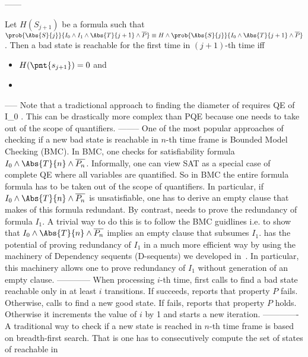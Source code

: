 ------
\begin{proposition}
\label{prop:bad_state}
Let $H(S_{j+1})$ be a formula such that $\prob{\Abs{S}{j}}{I_0 \wedge
  I_1 \wedge \Abs{T}{j+1} \wedge \overline{P}} \equiv H \wedge
\prob{\Abs{S}{j}}{I_0 \wedge \Abs{T}{j+1} \wedge \overline{P}}$.
Then a bad state  is reachable for the first time in $(j+1)$-th
time iff 
\begin{itemize}
\item $H(\pnt{s_{j+1}})=0$ and 
\item {} 
\end{itemize}
\end{proposition}
-----
 Note that
a tradictional approach to finding the diameter of \Ks requires
 QE of  {I_0 \wedge {}}. This
can be drastically more complex than PQE because one needs to take
 out of the scope of quantifiers.
--------
One of the most popular approaches of checking if a new bad state is
reachable in $n$-th time frame is Bounded Model Checking (BMC). In
BMC, one checks for satisfiability formula $I_0 \wedge \Abs{T}{n}
\wedge \overline{P_n}$. Informally, one can view SAT as a special case
of complete QE where all variables are quantified. So in BMC the
entire formula formula has to be taken out of the scope of
quantifiers.  In particular, if $I_0 \wedge \Abs{T}{n} \wedge
\overline{P_n}$ is unsatisfiable, one has to derive an empty clause
that makes  of this formula redundant. By contrast,
\NBS needs to prove  the redundancy of formula $I_1$. A
trivial way to do this is to follow the BMC guidlines i.e. to show
that $I_0 \wedge \Abs{T}{n} \wedge \overline{P_n}$ implies an empty
clause that subsumes $I_1$.  \NBS has the potential of proving
redundancy of $I_1$ in a much more efficient way by using the
machinery of Dependency sequents (D-sequents) we developed
in~\cite{fmcad12,fmcad13}.  In particular, this machinery allows one
to prove redundancy of $I_1$ without generation of an empty clause. 
------------
 When processing $i$-th time, \ST first calls \NBS to find a
bad state reachable only in at least $i$ transitions.  If \NBS
succeeds, \ST reports that property $P$ fails. Otherwise, \ST calls
\NS to find a new good state.  If \NS fails, \ST reports that property
$P$ holds. Otherwise it increments the value of $i$ by 1 and starts a
new iteration.
-------------
 A
traditional way to check if a new state is reached in $n$-th time
frame is based on breadth-first search. That is one has to
consecutively compute the set of states of reachable in
